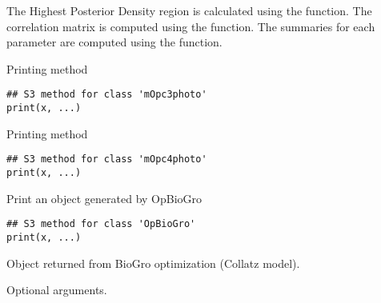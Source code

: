 \documentclass[letterpaper]{book}
\begin{document}
%
\begin{Details}\relax
The Highest Posterior Density region is calculated using
the  function.  The correlation
matrix is computed using the  function.
The summaries for each parameter are computed using the
 function.
\end{Details}
%
\begin{SeeAlso}\relax
{}
\end{SeeAlso}
%
\begin{Description}\relax
Printing method
\end{Description}
%
\begin{Usage}
\begin{verbatim}
## S3 method for class 'mOpc3photo'
print(x, ...)
\end{verbatim}
\end{Usage}
%
\begin{Description}\relax
Printing method
\end{Description}
%
\begin{Usage}
\begin{verbatim}
## S3 method for class 'mOpc4photo'
print(x, ...)
\end{verbatim}
\end{Usage}
%
\begin{Description}\relax
Print an object generated by OpBioGro
\end{Description}
%
\begin{Usage}
\begin{verbatim}
## S3 method for class 'OpBioGro'
print(x, ...)
\end{verbatim}
\end{Usage}
%
\begin{Arguments}
\begin{ldescription}
\item[\code{x}] Object returned from BioGro optimization
(Collatz model).

\item[\code{...}] Optional arguments.
\end{ldescription}
\end{Arguments}
%
\begin{SeeAlso}\relax
{}
\end{SeeAlso}
\end{document}
